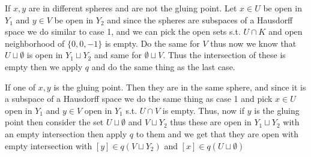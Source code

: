 \documentclass[12pt, letterpaper]{article}
\begin{document}
If $x,y$ are in different spheres and are not the gluing point. Let $x \in U$ be open in $Y_1$ and $y \in V$ be open in $Y_2$ and since the spheres are subspaces of a Hausdorff space we do similar to case 1, and we can pick the open sets s.t. $U \cap K$ and open neighborhood of $\{0,0,-1\}$ is empty. Do the same for $V$ thus now we know that $U \sqcup \emptyset$ is open in $Y_1 \sqcup Y_2$ and same for $\emptyset \sqcup V$. Thus the intersection of these is empty then we apply $q$ and do the same thing as the last case.

If one of $x,y$ is the gluing point. Then they are in the same sphere, and since it is a subspace of a Hausdorff space we do the same thing as case 1 and pick $x \in U$ open in $Y_1$ and $y \in V$ open in $Y_1$ s.t. $U \cap V$ is empty. Thus, now if $y$ is the gluing point then consider the set $U \sqcup \emptyset$ and $V \sqcup Y_2$ thus these are open in $Y_1 \sqcup Y_2$ with an empty intersection then apply $q$ to them and we get that they are open with empty intersection with $[y] \in q(V \sqcup Y_2)$ and $[x] \in q(U \sqcup \emptyset)$
\end{document}
